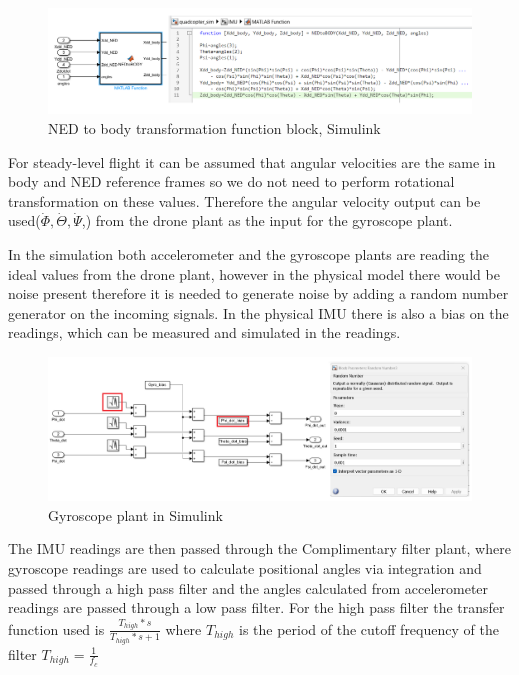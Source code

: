 \begin{figure}[H]
    \begin{center}
    \includegraphics[scale = 0.5]{pictures/IMU/NED_to_bidy_function_block.png}
    \end{center}
    \caption{NED to body transformation function block, Simulink}
    \label{fig:my_label}
\end{figure}

For steady-level flight it can be assumed that angular velocities are the same in body and NED reference frames so we do not need to perform rotational transformation on these values. Therefore the angular velocity output can  be used($\dot{\Phi}, \dot{\Theta}, \dot{\Psi}$,) from the drone plant as the input for the gyroscope plant. 

In the simulation both accelerometer and the gyroscope plants are reading the ideal values from the drone plant, however in the physical model there would be noise present therefore it is needed to generate noise by adding a random number generator on the incoming signals. In the physical IMU there is also a bias on the readings, which can be measured and simulated in the readings.

\begin{figure}[H]
    \begin{center}
    \includegraphics[scale = 0.45]{pictures/IMU/gyro_plant_nr_genrator.png}
    \end{center}
    \caption{Gyroscope plant in Simulink}
    \label{fig:my_label}
\end{figure}

The IMU readings are then passed through the Complimentary filter plant, where gyroscope readings are used to calculate positional angles via integration and passed through a high pass filter and the angles calculated from accelerometer readings are passed through a low pass filter. For the high pass filter the transfer function used is $\frac{T_{high}*s}{T_{high}*s+1}$ where $T_{high}$ is the period of the cutoff frequency of the filter $T_{high}=\frac{1}{f_c}$


